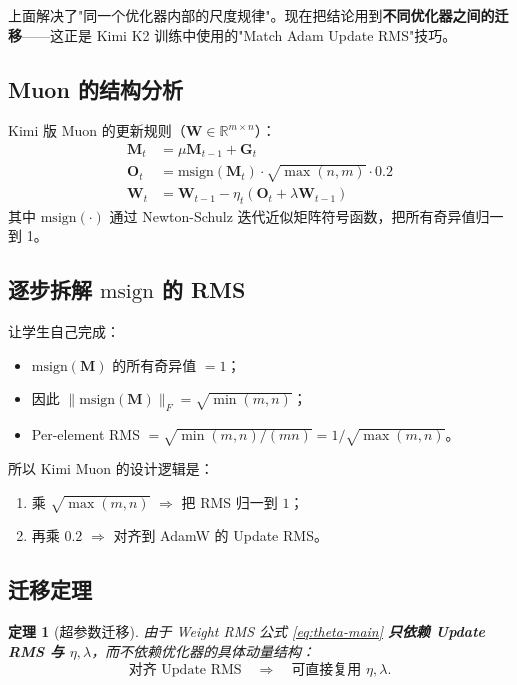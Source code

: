 \documentclass[11pt,a4paper]{ctexart}
\newtheorem{theorem}{定理}[section]
\theoremstyle{definition}
\theoremstyle{remark}
\newcommand{\msign}{\mathrm{msign}}
\begin{document}
上面解决了"同一个优化器内部的尺度规律"。现在把结论用到\textbf{不同优化器之间的迁移}——这正是 Kimi K2 训练中使用的"Match Adam Update RMS"技巧。
 
\subsection{Muon 的结构分析}
 
Kimi 版 Muon 的更新规则（$\bm{W} \in \mathbb{R}^{m \times n}$）：
\begin{align}
\bm{M}_t &= \mu \bm{M}_{t-1} + \bm{G}_t \\
\bm{O}_t &= \msign(\bm{M}_t) \cdot \sqrt{\max(n, m)} \cdot 0.2 \\
\bm{W}_t &= \bm{W}_{t-1} - \eta_t(\bm{O}_t + \lambda \bm{W}_{t-1})
\end{align}
其中 $\msign(\cdot)$ 通过 Newton-Schulz 迭代近似矩阵符号函数，把所有奇异值归一到 1。
 
\subsection{\texorpdfstring{逐步拆解 $\msign$ 的 RMS}{逐步拆解 msign 的 RMS}}
 
让学生自己完成：
\begin{itemize}
    \item $\msign(\bm{M})$ 的所有奇异值 $= 1$；
    \item 因此 $\|\msign(\bm{M})\|_F = \sqrt{\min(m, n)}$；
    \item Per-element RMS $= \sqrt{\min(m,n)/(mn)} = 1/\sqrt{\max(m,n)}$。
\end{itemize}
 
所以 Kimi Muon 的设计逻辑是：
\begin{enumerate}
    \item 乘 $\sqrt{\max(m,n)}$ $\Longrightarrow$ 把 RMS 归一到 $1$；
    \item 再乘 $0.2$ $\Longrightarrow$ 对齐到 AdamW 的 Update RMS。
\end{enumerate}
 
\subsection{迁移定理}
 
\begin{theorem}[超参数迁移]
由于 Weight RMS 公式 \eqref{eq:theta-main} \textbf{只依赖 Update RMS 与 $\eta, \lambda$}，而不依赖优化器的具体动量结构：
\[
\text{对齐 Update RMS} \quad \Longrightarrow \quad \text{可直接复用 } \eta, \lambda.
\]
\end{theorem}
 
\end{document}
